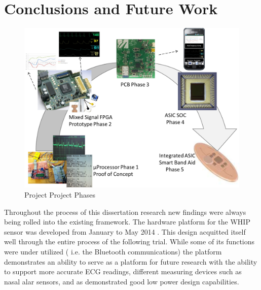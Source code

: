 \chapter{Conclusions and Future Work}
\label{chap:conclusions}

\begin{figure}
\centering
\includegraphics[width=0.7\linewidth]{Images/projectPhases}
\caption{Project Project Phases}
\label{fig:projectPhases}
\end{figure}


Throughout the process of this dissertation research new findings were always being rolled into the existing framework. The hardware platform for the WHIP sensor was developed from January to May 2014 . This design acquitted itself well through the entire process of the following trial. While some of its functions were under utilized ( i.e. the Bluetooth communications) the platform demonstrates an ability to serve as a platform for future research with the ability to support more accurate ECG readings, different  measuring devices such as nasal alar sensors, and as demonstrated good low power design capabilities. 

